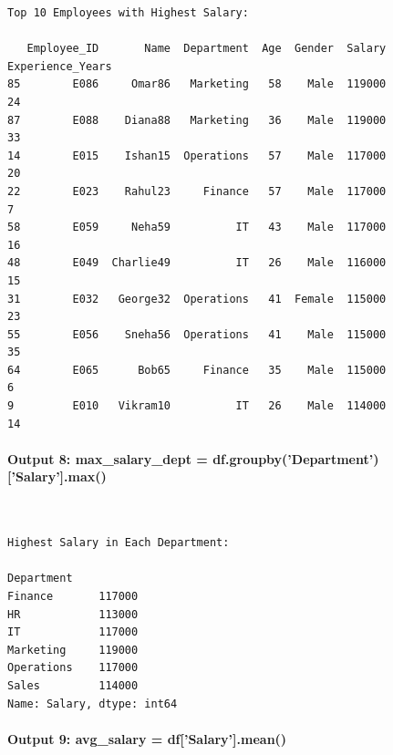 \documentclass[12pt,a4paper,oneside]{report}
\begin{document}
\begin{Verbatim}[commandchars=\\\{\},breaklines=true,breakanywhere=true,fontsize=\scriptsize,frame=leftline,framesep=2mm,rulecolor=\color{gray}]
Top 10 Employees with Highest Salary:

   Employee_ID       Name  Department  Age  Gender  Salary  Experience_Years
85        E086     Omar86   Marketing   58    Male  119000                24
87        E088    Diana88   Marketing   36    Male  119000                33
14        E015    Ishan15  Operations   57    Male  117000                20
22        E023    Rahul23     Finance   57    Male  117000                 7
58        E059     Neha59          IT   43    Male  117000                16
48        E049  Charlie49          IT   26    Male  116000                15
31        E032   George32  Operations   41  Female  115000                23
55        E056    Sneha56  Operations   41    Male  115000                35
64        E065      Bob65     Finance   35    Male  115000                 6
9         E010   Vikram10          IT   26    Male  114000                14
\end{Verbatim}
\paragraph{Output 8: max\_salary\_dept = df.groupby('Department')['Salary'].max()}\mbox{}\\[-1ex]
\begin{Verbatim}[commandchars=\\\{\},breaklines=true,breakanywhere=true,fontsize=\scriptsize,frame=leftline,framesep=2mm,rulecolor=\color{gray}]
Highest Salary in Each Department:

Department
Finance       117000
HR            113000
IT            117000
Marketing     119000
Operations    117000
Sales         114000
Name: Salary, dtype: int64
\end{Verbatim}
\paragraph{Output 9: avg\_salary = df['Salary'].mean()}\mbox{}\\[-1ex]
\end{document}
